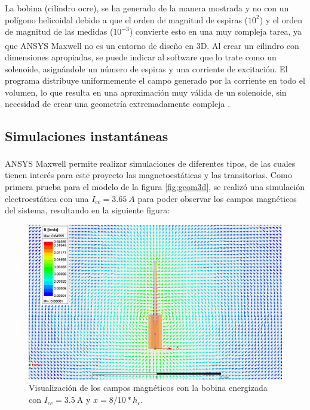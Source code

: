 La bobina (cilindro ocre), se ha generado de la manera mostrada y no con un polígono helicoidal debido a que el orden de magnitud de espiras (\(10^2\)) y el orden de magnitud de las medidas (\(10^{-3}\)) convierte esto en una muy compleja tarea, ya que ANSYS Maxwell\textsuperscript{\textregistered} no es un entorno de diseño en 3D. Al crear un cilindro con dimensiones apropiadas, se puede indicar al software que lo trate como un solenoide, asignándole un número de espiras y una corriente de excitación. El programa distribuye uniformemente el campo generado por la corriente en todo el volumen, lo que resulta en una aproximación muy válida de un solenoide, sin necesidad de crear una geometría extremadamente compleja \citep[p. 13]{ansoft2012maxwell}.

\subsection{Simulaciones instantáneas}
ANSYS Maxwell\textsuperscript{\textregistered} permite realizar simulaciones de diferentes tipos, de las cuales tienen interés para este proyecto las magnetoestáticas y las transitorias. Como primera prueba para el modelo de la figura \ref{fig:geom3d}, se realizó una simulación electroestática con una \(I_{cc}=3.65~A\) para poder observar los campos magnéticos del sistema, resultando en la siguiente figura:

\begin{figure}[H]
    \centering
    \includegraphics[width=14cm]{FigurasMemoria/fields8.PNG}
    \caption{Visualización de los campos magnéticos con la bobina energizada con \(I_{cc}=3.5~\text{A}\) y \(x=8/10 * h_c\).}
    \label{fig:fields8} %
\end{figure}

